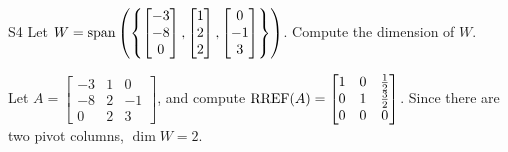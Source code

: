 \begin{problem}{S4}
Let \(W = \operatorname{span} \left( \left\{  \begin{bmatrix} -3 \\ -8 \\ 0 \end{bmatrix}, \begin{bmatrix} 1 \\ 2 \\ 2 \end{bmatrix}, \begin{bmatrix} 0 \\ -1 \\ 3 \end{bmatrix} \right\} \right)\).  Compute the dimension of \(W\).
\end{problem}
\begin{solution}
Let \(A= \begin{bmatrix}-3 & 1 & 0 \\ -8 & 2 & -1 \\ 0 & 2 & 3\end{bmatrix}\), and compute \(\operatorname{RREF}(A) = \begin{bmatrix} 1 & 0 & \frac{1}{2} \\ 0 & 1 & \frac{3}{2} \\ 0 & 0 & 0 \end{bmatrix}\).
Since there are two pivot columns, \(\dim W = 2\).
\end{solution}


